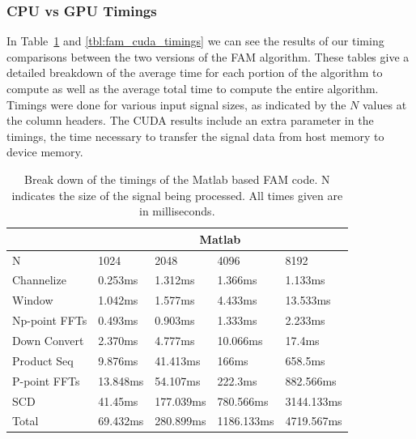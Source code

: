\subsubsection{CPU vs GPU Timings}
In Table~\ref{tbl:fam_matlab_timings} and \ref{tbl:fam_cuda_timings} we can see the results of our timing comparisons between the two versions of the FAM algorithm.  These tables give a detailed breakdown of the average time for each portion of the algorithm to compute as well as the average total time to compute the entire algorithm.  Timings were done for various input signal sizes, as indicated by the $N$ values at the column headers.  The CUDA results include an extra parameter in the timings, the time necessary to transfer the signal data from host memory to device memory.

\begin{table}
\begin{center}
\begin{tabular}{|l|l|l|l|l|}
\hline
 & \multicolumn{4}{|c|}{Matlab} \\
\hline
N & 1024 & 2048 & 4096 & 8192 \\
\hline
Channelize & 0.253ms & 1.312ms & 1.366ms & 1.133ms \\
Window & 1.042ms & 1.577ms & 4.433ms & 13.533ms \\
Np-point FFTs & 0.493ms & 0.903ms & 1.333ms & 2.233ms \\
Down Convert & 2.370ms & 4.777ms & 10.066ms & 17.4ms \\
Product Seq & 9.876ms & 41.413ms & 166ms & 658.5ms \\
P-point FFTs & 13.848ms & 54.107ms & 222.3ms & 882.566ms \\
SCD & 41.45ms & 177.039ms & 780.566ms & 3144.133ms \\
\hline
Total & 69.432ms & 280.899ms & 1186.133ms & 4719.567ms \\
\hline
\end{tabular}
\caption{Break down of the timings of the Matlab based FAM code.  N indicates the size of the signal being processed.  All times given are in milliseconds.}
\label{tbl:fam_matlab_timings}
\end{center}
\end{table}


